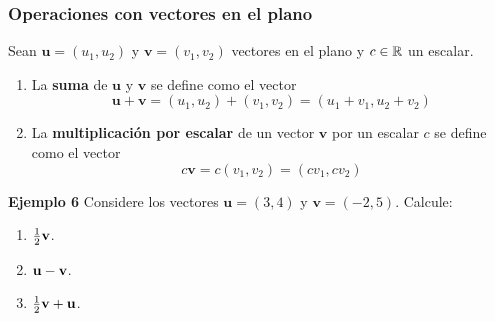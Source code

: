 {\nologo
\begin{frame}\frametitle{Operaciones con vectores en el plano}

\begin{block}{}%
	\justifying
	Sean $\mathbf{u}=(u_1,u_2)$ y $\mathbf{v}=(v_1,v_2)$ vectores en el plano y $c\in\mathbb{R}$ un escalar.
	\begin{enumerate}
		\item La \textbf{suma} de $\mathbf{u}$ y $\mathbf{v}$ se define como el vector
		\[
		\mathbf{u+v} = (u_1,u_2) + (v_1,v_2) = (u_1+v_1,u_2+v_2)
		\]
		\item La \textbf{multiplicación por escalar} de un vector $\mathbf{v}$ por un escalar $c$ se define como el vector
		\[
		c\mathbf{v} = c(v_1,v_2) = (cv_1,cv_2)
		\]	
	\end{enumerate}
\end{block}

\begin{ej}{\textbf{Ejemplo 6}}
	Considere los vectores $\mathbf{u}=(3,4)$ y $\mathbf{v}=(-2,5)$. Calcule:
	
	\vspace{-2mm}
	\begin{multicols}{3}
		\begin{enumerate}
			\item[\labelname{$a$}] $\frac{1}{2}\mathbf{v}$.
			\item[\labelname{$b$}] $\mathbf{u}-\mathbf{v}$.
			\item[\labelname{$c$}] $\frac{1}{2}\mathbf{v}+\mathbf{u}$.
		\end{enumerate}
	\end{multicols}
	
	\vspace{-2mm}
\end{ej}

\end{frame}
}
	

\subsection{} 

